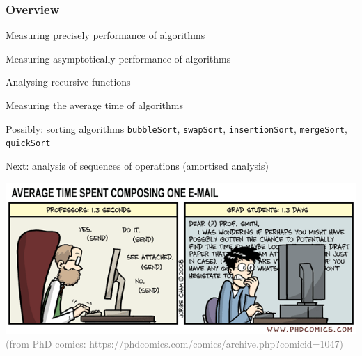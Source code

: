 \documentclass[aspectratio=169]{beamer}
\begin{document}
\frame[plain]{\titlepage}


\begin{frame}[t]\frametitle{Overview}


  \begin{itemize}
    {\color{black!25}
    \item Measuring {precisely} performance of algorithms
    \item Measuring {asymptotically} performance of algorithms
    \item Analysing {recursive} functions}
    \item Measuring  the \alert{average time} of algorithms
    {\color{black!25}
    \item Possibly: sorting algorithms \texttt{bubbleSort}, \texttt{swapSort}, \texttt{insertionSort}, \texttt{mergeSort}, \texttt{quickSort}}
    \item Next: analysis of sequences of operations (\alert{amortised analysis})
  \end{itemize}
\end{frame}


\begin{frame}%
  \centering

  \includegraphics[width=\textwidth]{images/phd072508s}
  \\
  {\footnotesize \textcolor{gray}{(from PhD comics: https://phdcomics.com/comics/archive.php?comicid=1047)}}

\end{frame}
\end{document}
